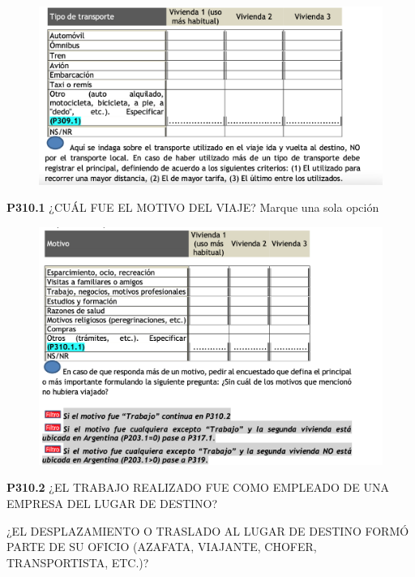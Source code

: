 \documentclass[
  openany]{book}
\begin{document}
\begin{figure}

{\centering \includegraphics[width=1\linewidth]{imagenes/figura6-164} 

}

\end{figure}

\textbf{P310.1} ¿CUÁL FUE EL MOTIVO DEL VIAJE?
Marque una sola opción

\begin{figure}

{\centering \includegraphics[width=1\linewidth]{imagenes/figura6-165} 

}

\end{figure}

\textbf{P310.2} ¿EL TRABAJO REALIZADO FUE COMO EMPLEADO DE UNA EMPRESA DEL LUGAR DE DESTINO?

¿EL DESPLAZAMIENTO O TRASLADO AL LUGAR DE DESTINO FORMÓ PARTE DE SU OFICIO (AZAFATA, VIAJANTE, CHOFER, TRANSPORTISTA, ETC.)?
\end{document}
